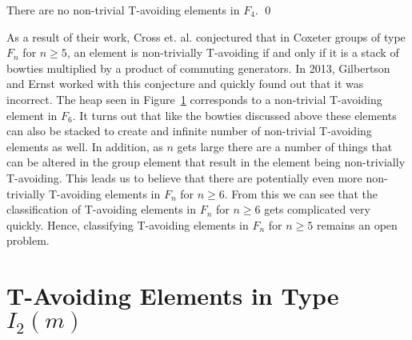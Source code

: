 \begin{corollary}
There are no non-trivial T-avoiding elements in $F_4$. \qed	
\end{corollary}

As a result of their work, Cross et. al. conjectured that in Coxeter groups of type $F_n$ for $n \geq 5$, an element is non-trivially T-avoiding if and only if it is a stack of bowties multiplied by a product of commuting generators. In 2013, Gilbertson and Ernst worked with this conjecture and quickly found out that it was incorrect. The heap seen in Figure~\ref{} corresponds to a non-trivial T-avoiding element in $F_6$. It turns out that like the bowties discussed above these elements can also be stacked to create and infinite number of non-trivial T-avoiding elements as well. In addition, as $n$ gets large there are a number of things that can be altered in the group element that result in the element being non-trivially T-avoiding. This leads us to believe that there are potentially even more non-trivially T-avoiding elements in $F_n$ for $n \geq 6$. From this we can see that the classification of T-avoiding elements in $F_n$ for $n \geq 6$ gets complicated very quickly. Hence, classifying T-avoiding elements in $F_n$ for $n \geq 5$ remains an open problem.


\section{T-Avoiding Elements in Type $I_2(m)$}

